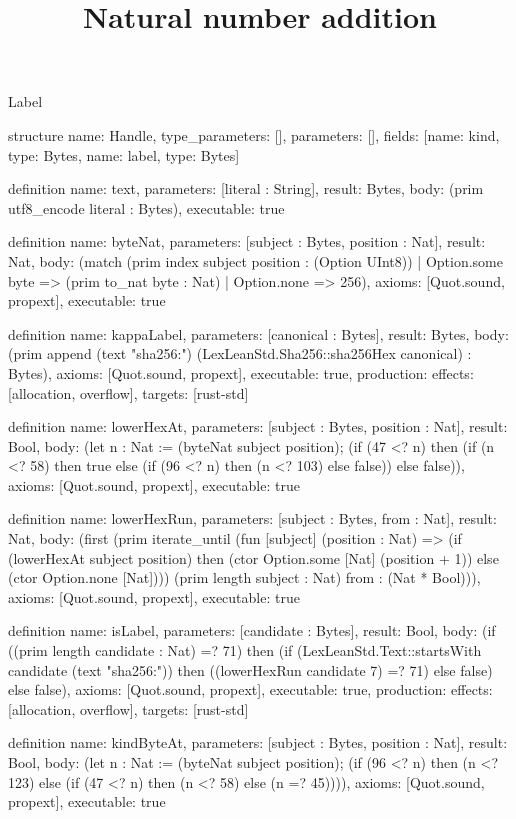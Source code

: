 \begin{lexlean}{Label}
\title{Natural number addition}
\begin{semanticmodule}
structure{
  name: Handle,
  type_parameters: [],
  parameters: [],
  fields: [{name: kind, type: Bytes}, {name: label, type: Bytes}]
}

definition{
  name: text,
  parameters: [literal : String],
  result: Bytes,
  body: (prim utf8_encode literal : Bytes),
  executable: true
}

definition{
  name: byteNat,
  parameters: [subject : Bytes, position : Nat],
  result: Nat,
  body: (match (prim index subject position : (Option UInt8))
    | Option.some byte => (prim to_nat byte : Nat)
    | Option.none => 256),
  axioms: [Quot.sound, propext],
  executable: true
}

definition{
  name: kappaLabel,
  parameters: [canonical : Bytes],
  result: Bytes,
  body: (prim append (text "sha256:") (LexLeanStd.Sha256::sha256Hex canonical) : Bytes),
  axioms: [Quot.sound, propext],
  executable: true,
  production: {effects: [allocation, overflow], targets: [rust-std]}
}

definition{
  name: lowerHexAt,
  parameters: [subject : Bytes, position : Nat],
  result: Bool,
  body: (let n : Nat := (byteNat subject position); (if (47 <? n) then (if (n <? 58) then true else (if (96 <? n) then (n <? 103) else false)) else false)),
  axioms: [Quot.sound, propext],
  executable: true
}

definition{
  name: lowerHexRun,
  parameters: [subject : Bytes, from : Nat],
  result: Nat,
  body: (first (prim iterate_until (fun [subject] (position : Nat) => (if (lowerHexAt subject position) then (ctor Option.some [Nat] (position + 1)) else (ctor Option.none [Nat]))) (prim length subject : Nat) from : (Nat * Bool))),
  axioms: [Quot.sound, propext],
  executable: true
}

definition{
  name: isLabel,
  parameters: [candidate : Bytes],
  result: Bool,
  body: (if ((prim length candidate : Nat) =? 71) then (if (LexLeanStd.Text::startsWith candidate (text "sha256:")) then ((lowerHexRun candidate 7) =? 71) else false) else false),
  axioms: [Quot.sound, propext],
  executable: true,
  production: {effects: [allocation, overflow], targets: [rust-std]}
}

definition{
  name: kindByteAt,
  parameters: [subject : Bytes, position : Nat],
  result: Bool,
  body: (let n : Nat := (byteNat subject position); (if (96 <? n) then (n <? 123) else (if (47 <? n) then (n <? 58) else (n =? 45)))),
  axioms: [Quot.sound, propext],
  executable: true
}


\end{semanticmodule}
\end{lexlean}
